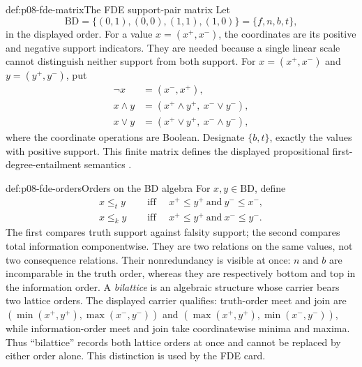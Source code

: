 \begin{hbdefinition}{def:p08-fde-matrix}{The FDE support-pair matrix}
Let
\[
 \mathrm{BD}=\{(0,1),(0,0),(1,1),(1,0)\}
 =\{f,n,b,t\},
\]
in the displayed order.  For a value \(x=(x^+,x^-)\), the coordinates are its
positive and negative support indicators.  They are needed because a single
linear scale cannot distinguish neither support from both support.  For
\(x=(x^+,x^-)\) and \(y=(y^+,y^-)\), put
\[
\begin{aligned}
 \neg x&=(x^-,x^+),\\
 x\land y&=(x^+\land y^+,\ x^-\lor y^-),\\
 x\lor y&=(x^+\lor y^+,\ x^-\land y^-),
\end{aligned}
\]
where the coordinate operations are Boolean.  Designate
\(\{b,t\}\), exactly the values with positive support.
This finite matrix defines the displayed propositional first-degree-entailment
semantics \cite{Dunn1976,Belnap1977,OmoriWansing2017}.
\end{hbdefinition}

\begin{hbdefinition}{def:p08-fde-orders}{Orders on the BD algebra}
For \(x,y\in\mathrm{BD}\), define
\[
\begin{aligned}
 x\leq_t y
 &\quad\text{ iff }\quad
 x^+\leq y^+\ \text{and}\ y^-\leq x^-,\\
 x\leq_k y
 &\quad\text{ iff }\quad
 x^+\leq y^+\ \text{and}\ x^-\leq y^-.
\end{aligned}
\]
The first compares truth support against falsity support; the second compares
total information componentwise.  They are two relations on the same values,
not two consequence relations.  Their nonredundancy is visible at once:
\(n\) and \(b\) are incomparable in the truth order, whereas
they are respectively bottom and top in the information order.  A
\emph{bilattice} is an algebraic structure whose carrier bears two lattice
orders.  The displayed carrier qualifies: truth-order meet and join are
\((\min(x^+,y^+),\max(x^-,y^-))\) and
\((\max(x^+,y^+),\min(x^-,y^-))\), while information-order meet and join take
coordinatewise minima and maxima.  Thus ``bilattice'' records both lattice
orders at once and cannot be replaced by either order alone.  This distinction
is used by the FDE card.
\end{hbdefinition}

